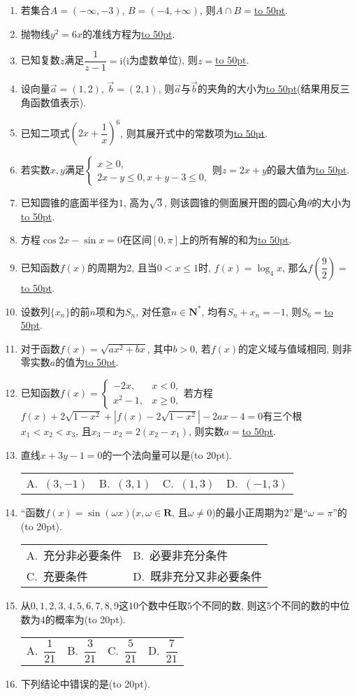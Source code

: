 \documentclass[10pt,a4paper]{article}
\newcommand{\blank}[1]{\underline{\hbox to #1pt{}}}
\newcommand{\bracket}[1]{(\hbox to #1pt{})}
\newcommand{\twoch}[4]{\par\begin{tabular}{p{.46\textwidth}p{.46\textwidth}}
A.~#1& B.~#2\\
C.~#3& D.~#4
\end{tabular}}
\newcommand{\fourch}[4]{\par\begin{tabular}{p{.23\textwidth}p{.23\textwidth}p{.23\textwidth}p{.23\textwidth}}
A.~#1 &B.~#2& C.~#3& D.~#4
\end{tabular}}
\begin{document}
\begin{enumerate}[1.]
\item 若集合$A=(-\infty ,-3)$, $B=(-4,+\infty)$, 则$A\cap B=$\blank{50}.
\item 抛物线$y^2=6x$的准线方程为\blank{50}.
\item 已知复数$z$满足$\dfrac 1{z-1}=\mathrm{i}$($\mathrm{i}$为虚数单位), 则$z=$\blank{50}.
\item 设向量$\overrightarrow a = (1,2)$, $\overrightarrow b = (2,1)$, 则$\overrightarrow a$与$\overrightarrow b$的夹角的大小为\blank{50}(结果用反三角函数值表示).
\item 已知二项式$(2x+\dfrac 1x)^6$, 则其展开式中的常数项为\blank{50}.
\item 若实数$x,y$满足$\begin{cases} x\ge 0, \\ 2x-y \le 0, x+y-3\le 0,\end{cases}$则$z=2x+y$的最大值为\blank{50}.
\item 已知圆锥的底面半径为$1$, 高为$\sqrt 3$, 则该圆锥的侧面展开图的圆心角$\theta$的大小为\blank{50}.
\item 方程$\cos 2x-\sin x=0$在区间$[0,\pi]$上的所有解的和为\blank{50}.
\item 已知函数$f(x)$的周期为$2$, 且当$0<x\le 1$时, $f(x)=\log_4x$, 那么$f(\dfrac 92)=$\blank{50}.
\item 设数列$\{x_n\}$的前$n$项和为$S_n$, 对任意$n\in \mathbf{N}^*$, 均有$S_n+x_n=-1$, 则$S_6=$\blank{50}.
\item 对于函数$f(x)=\sqrt {ax^2+bx}$, 其中$b>0$, 若$f(x)$的定义域与值域相同, 则非零实数$a$的值为\blank{50}.
\item 已知函数$f(x)=\begin{cases}  -2x, & x<0, \\  x^2-1, & x\ge 0,\end{cases}$若方程$f(x)+2\sqrt {1-x^2}+|f(x)-2\sqrt {1-x^2}|-2ax-4=0$有三个根$x_1<x_2<x_3$, 且$x_3-x_2=2(x_2-x_1)$, 则实数$a=$\blank{50}.
\item 直线$x+3y-1=0$的一个法向量可以是\bracket{20}.
\fourch{$(3,-1)$}{$(3,1)$}{$(1,3)$}{$(-1,3)$}
\item ``函数$f(x)=\sin (\omega x)$($x,\omega \in \mathbf{R}$, 且$\omega \ne 0$)的最小正周期为$2$''是``$\omega =\pi$''的\bracket{20}.
\twoch{充分非必要条件}{必要非充分条件}{充要条件}{既非充分又非必要条件}
\item 从$0,1,2,3,4,5,6,7,8,9$这$10$个数中任取$5$个不同的数, 则这$5$个不同的数的中位数为$4$的概率为\bracket{20}.
\fourch{$\dfrac 1{21}$}{$\dfrac 3{21}$}{$\dfrac 5{21}$}{$\dfrac 7{21}$}
\item 下列结论中错误的是\bracket{20}.

\end{enumerate}
\end{document}
